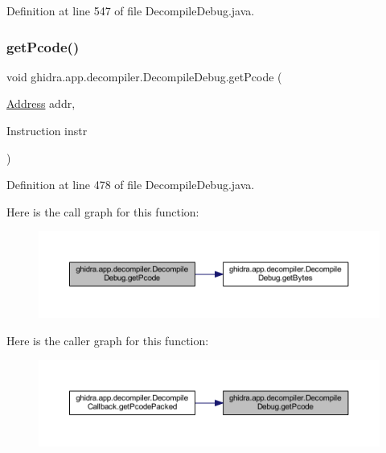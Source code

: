 Definition at line 547 of file Decompile\+Debug.\+java.

\mbox{\label{classghidra_1_1app_1_1decompiler_1_1_decompile_debug_a3ecedafa761807dad9dc91be7b6e0e27}} 
\subsubsection{\texorpdfstring{getPcode()}{getPcode()}}
{\footnotesize\ttfamily void ghidra.\+app.\+decompiler.\+Decompile\+Debug.\+get\+Pcode (\begin{DoxyParamCaption}\item[{\mbox{\hyperlink{class_address}{Address}}}]{addr,  }\item[{Instruction}]{instr }\end{DoxyParamCaption})\hspace{0.3cm}{\ttfamily [inline]}}



Definition at line 478 of file Decompile\+Debug.\+java.

Here is the call graph for this function\+:
\nopagebreak
\begin{figure}[H]
\begin{center}
\leavevmode
\includegraphics[width=350pt]{classghidra_1_1app_1_1decompiler_1_1_decompile_debug_a3ecedafa761807dad9dc91be7b6e0e27_cgraph}
\end{center}
\end{figure}
Here is the caller graph for this function\+:
\nopagebreak
\begin{figure}[H]
\begin{center}
\leavevmode
\includegraphics[width=350pt]{classghidra_1_1app_1_1decompiler_1_1_decompile_debug_a3ecedafa761807dad9dc91be7b6e0e27_icgraph}
\end{center}
\end{figure}
\mbox{\label{classghidra_1_1app_1_1decompiler_1_1_decompile_debug_a22f376783b458dd183febc07c79e9243}} 
